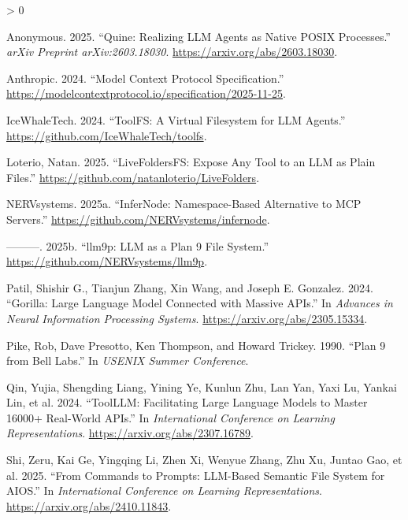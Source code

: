 \documentclass[
  11pt,
]{article}
\newlength{\cslhangindent}
\newenvironment{CSLReferences}[2] %
 {%
  \setlength{\parindent}{0pt}
  \ifodd #1 \everypar{\setlength{\hangindent}{\cslhangindent}}\ignorespaces\fi
  \ifnum #2 > 0
  \setlength{\parskip}{#2\baselineskip}
  \fi
 }%
 {}
\begin{document}
\hypertarget{refs}{}
\begin{CSLReferences}{1}{0}
\leavevmode{}%
Anonymous. 2025. {``Quine: Realizing {LLM} Agents as Native {POSIX}
Processes.''} \emph{arXiv Preprint arXiv:2603.18030}.
\url{https://arxiv.org/abs/2603.18030}.

\leavevmode{}%
Anthropic. 2024. {``Model Context Protocol Specification.''}
\url{https://modelcontextprotocol.io/specification/2025-11-25}.

\leavevmode{}%
IceWhaleTech. 2024. {``{ToolFS}: A Virtual Filesystem for {LLM}
Agents.''} \url{https://github.com/IceWhaleTech/toolfs}.

\leavevmode{}%
Loterio, Natan. 2025. {``{LiveFoldersFS}: Expose Any Tool to an {LLM} as
Plain Files.''} \url{https://github.com/natanloterio/LiveFolders}.

\leavevmode{}%
NERVsystems. 2025a. {``{InferNode}: Namespace-Based Alternative to {MCP}
Servers.''} \url{https://github.com/NERVsystems/infernode}.

\leavevmode{}%
---------. 2025b. {``{llm9p}: {LLM} as a Plan 9 File System.''}
\url{https://github.com/NERVsystems/llm9p}.

\leavevmode{}%
Patil, Shishir G., Tianjun Zhang, Xin Wang, and Joseph E. Gonzalez.
2024. {``Gorilla: Large Language Model Connected with Massive {APIs}.''}
In \emph{Advances in Neural Information Processing Systems}.
\url{https://arxiv.org/abs/2305.15334}.

\leavevmode{}%
Pike, Rob, Dave Presotto, Ken Thompson, and Howard Trickey. 1990.
{``Plan 9 from {Bell Labs}.''} In \emph{USENIX Summer Conference}.

\leavevmode{}%
Qin, Yujia, Shengding Liang, Yining Ye, Kunlun Zhu, Lan Yan, Yaxi Lu,
Yankai Lin, et al. 2024. {``{ToolLLM}: Facilitating Large Language
Models to Master 16000+ Real-World {APIs}.''} In \emph{International
Conference on Learning Representations}.
\url{https://arxiv.org/abs/2307.16789}.

\leavevmode{}%
Shi, Zeru, Kai Ge, Yingqing Li, Zhen Xi, Wenyue Zhang, Zhu Xu, Juntao
Gao, et al. 2025. {``From Commands to Prompts: {LLM}-Based Semantic File
System for {AIOS}.''} In \emph{International Conference on Learning
Representations}. \url{https://arxiv.org/abs/2410.11843}.


\end{CSLReferences}
\end{document}
